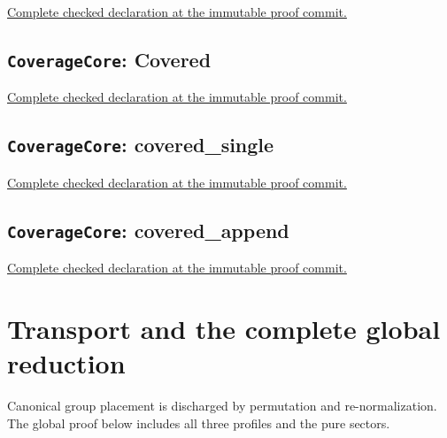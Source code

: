 \noindent\href{https://github.com/alectionary/vibe-math/blob/3ae21c0719cedbd928f4f7882f9b9e266567605e/formalization/distance-preservation/truncated12/TorsionClassical.lean#L66-L74}{Complete checked declaration at the immutable proof commit.}



\subsection*{\texttt{CoverageCore}: Covered}

\noindent\href{https://github.com/alectionary/vibe-math/blob/3ae21c0719cedbd928f4f7882f9b9e266567605e/formalization/distance-preservation/truncated12/CoverageCore.lean#L7-L8}{Complete checked declaration at the immutable proof commit.}



\subsection*{\texttt{CoverageCore}: covered\_single}

\noindent\href{https://github.com/alectionary/vibe-math/blob/3ae21c0719cedbd928f4f7882f9b9e266567605e/formalization/distance-preservation/truncated12/CoverageCore.lean#L10-L15}{Complete checked declaration at the immutable proof commit.}



\subsection*{\texttt{CoverageCore}: covered\_append}

\noindent\href{https://github.com/alectionary/vibe-math/blob/3ae21c0719cedbd928f4f7882f9b9e266567605e/formalization/distance-preservation/truncated12/CoverageCore.lean#L17-L26}{Complete checked declaration at the immutable proof commit.}



\clearpage\section{Transport and the complete global reduction}

Canonical group placement is discharged by permutation and re-normalization. The global proof below includes all three profiles and the pure sectors.

